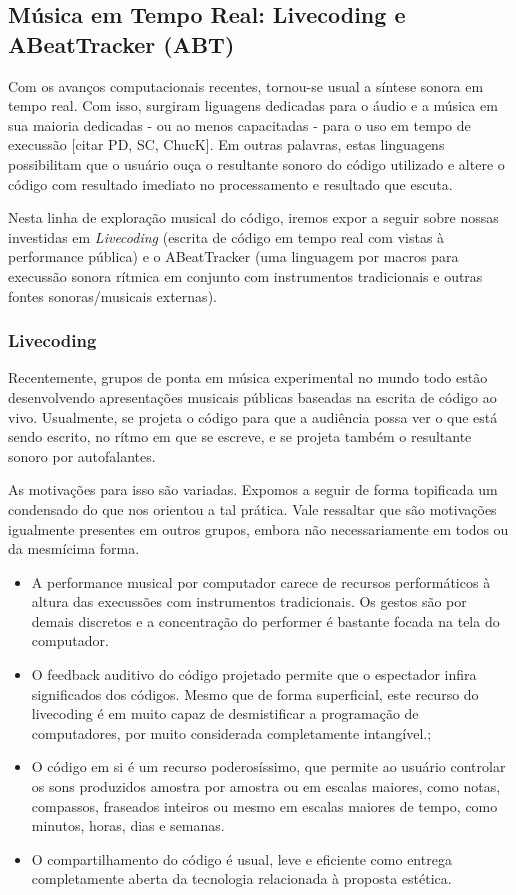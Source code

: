   \subsection{Música em Tempo Real: Livecoding e ABeatTracker (ABT)}

Com os avanços computacionais recentes, tornou-se usual a síntese sonora
em tempo real. Com isso, surgiram liguagens dedicadas para o áudio e a música
em sua maioria dedicadas - ou ao menos capacitadas - para o uso 
em tempo de execussão [citar PD, SC, ChucK]. Em outras palavras, estas linguagens
possibilitam que o usuário ouça o resultante sonoro do código utilizado e altere
o código com resultado imediato no processamento e resultado que escuta.

Nesta linha de exploração musical do código, iremos expor a seguir sobre
nossas investidas em \emph{Livecoding} (escrita de código em tempo real
com vistas à performance pública) e o ABeatTracker (uma linguagem por macros
para execussão sonora rítmica em conjunto com instrumentos tradicionais e outras
fontes sonoras/musicais externas).


        \subsubsection{Livecoding}

Recentemente, grupos de ponta em música experimental no mundo todo estão
desenvolvendo apresentações musicais públicas baseadas na escrita
de código ao vivo. Usualmente, se projeta o código para que a audiência possa
ver o que está sendo escrito, no rítmo em que se escreve, e se projeta também
o resultante sonoro por autofalantes.

As motivações para isso são variadas. Expomos a seguir de forma topificada
um condensado do que nos orientou a tal prática. Vale ressaltar que são
motivações igualmente presentes em outros grupos, embora não necessariamente
em todos ou da mesmícima forma.

\begin{itemize}
    \item A performance musical por computador carece de recursos performáticos
    à altura das execussões com instrumentos tradicionais. Os gestos são por demais
    discretos e a concentração do performer é bastante focada na tela do computador.
    \item O feedback auditivo do código projetado permite que o espectador infira
    significados dos códigos. Mesmo que de forma superficial, este recurso do livecoding
    é em muito capaz de desmistificar a programação de computadores, por muito considerada
    completamente intangível.;
    \item O código em si é um recurso poderosíssimo, que permite ao usuário controlar
    os sons produzidos amostra por amostra ou em escalas maiores, como notas, compassos, fraseados
    inteiros ou mesmo em escalas maiores de tempo, como minutos, horas, dias e semanas.
    \item O compartilhamento do código é usual, leve e eficiente como entrega completamente
    aberta da tecnologia relacionada à proposta estética.
\end{itemize}

